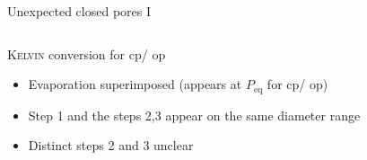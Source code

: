 \documentclass[../defence.tex]{subfiles}
\begin{document}
\begin{frame}{Unexpected closed pores I}
\begin{columns}[onlytextwidth, T]
\begin{block}{\textsc{Kelvin} conversion for cp/ op}
          \begin{tiny}
            \begin{itemize}
              \item Evaporation superimposed (appears at $P_\mathrm{eq}$ for cp/ op)
              \item Step 1 and the steps 2,3 appear on the same diameter range
              \item Distinct steps 2 and 3 unclear
            \end{itemize}
          \end{tiny}
        \end{block}
    \end{columns}
  \end{frame}
\end{document}

